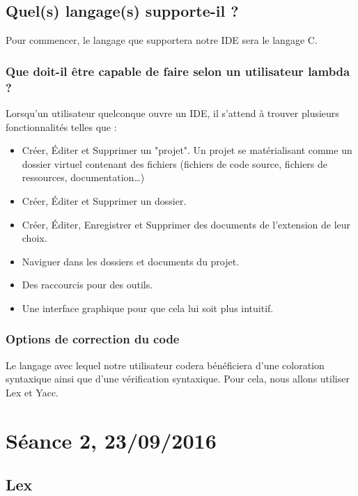 \documentclass[a4paper,12pt]{article}
\begin{document}
			
	\subsection{Quel(s) langage(s) supporte-il ?}

		Pour commencer, le langage que supportera notre IDE sera le langage C.

		\subsubsection{Que doit-il être capable de faire selon un utilisateur lambda ?}

			Lorsqu'un utilisateur quelconque  ouvre un IDE, il  s'attend à trouver
			plusieurs fonctionnalités telles que :

			\begin{itemize}
				\item  Créer,   Éditer  et  Supprimer   un  "projet".  Un   projet  se
  						matérialisant  comme  un  dossier  virtuel  contenant  des  fichiers
  						(fichiers    de    code     source,    fichiers    de    ressources,
  						documentation\dots)
				\item Créer, Éditer et Supprimer un dossier.
				\item  Créer,  Éditer,  Enregistrer  et  Supprimer  des  documents  de
  						l'extension de leur choix.
				\item Naviguer dans les dossiers et documents du projet.
				\item Des raccourcis pour des outils.
				\item Une interface graphique pour que cela lui soit plus intuitif.
			\end{itemize}

		\subsubsection{Options de correction du code}

			Le  langage avec  lequel  notre utilisateur  codera bénéficiera  d'une
			coloration syntaxique  ainsi que  d'une vérification  syntaxique. Pour
			cela, nous allons utiliser Lex et Yacc.
			
			
\section{Séance 2, 23/09/2016}

	\subsection{Lex}
	
\end{document}
